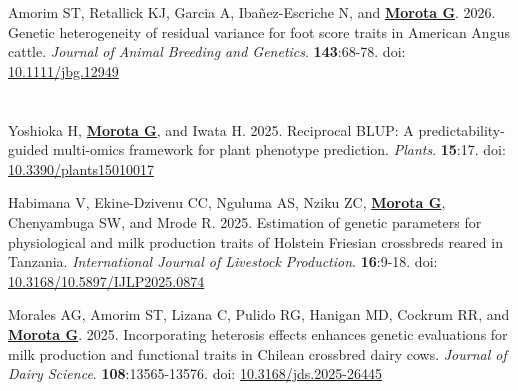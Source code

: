 \documentclass[margin,line,10pt]{res}
\newenvironment{list1}{
  \begin{list}{\ding{113}}{%
      \setlength{\itemsep}{0in}
      \setlength{\parsep}{0in} \setlength{\parskip}{0in}
      \setlength{\topsep}{0in} \setlength{\partopsep}{0in} 
      \setlength{\leftmargin}{0.17in}}}{\end{list}}
\begin{document}
\begin{resume}
\begin{list1}
\vspace{0.5cm}

\item [{\bf 92}.] Amorim ST, Retallick KJ, Garcia A, Iba\~{n}ez-Escriche N, and \textbf{\underline{Morota G}}. 2026. Genetic heterogeneity of residual variance for foot score traits in American Angus cattle. \emph{Journal of Animal Breeding and Genetics}. \textbf{143}:68-78. doi: \textcolor{blue}{\href{https://doi.org/10.1111/jbg.12949}{10.1111/jbg.12949}}

\end{list1}




\section{}
\begin{list1}

  \item [{\bf 91}.]  Yoshioka H, \textbf{\underline{Morota G}}, and Iwata H. 2025. Reciprocal BLUP: A predictability-guided multi-omics framework for plant phenotype prediction. \emph{Plants}. \textbf{15}:17. doi: \textcolor{blue}{\href{https://doi.org/10.3390/plants15010017}{10.3390/plants15010017}}

  \vspace{0.5cm}

  \item [{\bf 90}.] Habimana V, Ekine-Dzivenu CC, Nguluma AS,  Nziku ZC, \textbf{\underline{Morota G}}, Chenyambuga SW, and Mrode R. 2025. Estimation of genetic parameters for physiological and milk production traits of Holstein Friesian crossbreds reared in Tanzania. \emph{International Journal of Livestock Production}. \textbf{16}:9-18. doi: \textcolor{blue}{\href{https://doi.org/10.5897/IJLP2025.0874}{10.3168/10.5897/IJLP2025.0874}}

  \vspace{0.5cm}

  \item [{\bf 89}.] Morales AG, Amorim ST, Lizana C,  Pulido RG, Hanigan MD, Cockrum RR, and \textbf{\underline{Morota G}}. 2025. Incorporating heterosis effects enhances genetic evaluations for milk production and functional traits in Chilean crossbred dairy cows. \emph{Journal of Dairy Science}. \textbf{108}:13565-13576. doi: \textcolor{blue}{\href{https://doi.org/10.3168/jds.2025-26445}{10.3168/jds.2025-26445}}

 
  \vspace{0.5cm}


\end{list1}
\end{resume}
\end{document}
